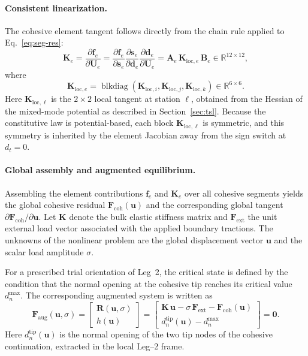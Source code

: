 \documentclass[smallextended]{svjour3}       %
\newcommand{\vb}[1]{\bm{#1}}      %
\newcommand{\mat}[1]{\mathbf{#1}}  %
\providecommand{\bd}{\vb d}
\renewcommand{\bd}{\vb d}
\begin{document}
\paragraph{Consistent linearization.}
The cohesive element tangent follows directly from the chain rule applied to
Eq.~\eqref{eq:seg-res}:
\begin{equation}
	\mat K_e
	=
	\frac{\partial \vb f_e}{\partial \vb U_e}
	=
	\frac{\partial \vb f_e}{\partial \vb s_e}
	\frac{\partial \vb s_e}{\partial \bd_e}
	\frac{\partial \bd_e}{\partial \vb U_e}
	=
	\mat A_e\,\mat K_{\mathrm{loc},e}\,\mat B_e
	\in\mathbb R^{12\times 12},
	\label{eq:seg-Ke}
\end{equation}
where
\begin{equation}
	\mat K_{\mathrm{loc},e}
	=
	\operatorname{blkdiag}
	\!\left(
	\mat{K}_{\mathrm{loc},i},
	\mat{K}_{\mathrm{loc},j},
	\mat{K}_{\mathrm{loc},k}
	\right)
	\in\mathbb R^{6\times 6}.
	\label{eq:seg-Kloc}
\end{equation}
Here \(\mathbf K_{\mathrm{loc},\ell}\) is the \(2\times2\) local tangent at
station \(\ell\), obtained from the Hessian of the mixed-mode potential as
described in Section~\ref{sec:tsl}. Because the constitutive law is
potential-based, each block \(\mat{K}_{\mathrm{loc},\ell}\) is symmetric,
and this symmetry is inherited by the element Jacobian away from the sign
switch at \(d_t=0\).

\paragraph{Global assembly and augmented equilibrium.}
Assembling the element contributions \(\vb f_e\) and \(\mat K_e\) over all
cohesive segments yields the global cohesive residual
\(\vb F_{\mathrm{coh}}(\vb u)\) and the corresponding global tangent
\(\partial\vb F_{\mathrm{coh}}/\partial\vb u\). Let \(\mat K\) denote the
bulk elastic stiffness matrix and \(\vb F_{\mathrm{ext}}\) the unit external
load vector associated with the applied boundary tractions. The unknowns of
the nonlinear problem are the global displacement vector \(\vb u\) and the
scalar load amplitude \(\sigma\).

For a prescribed trial orientation of Leg~2, the critical state is defined by
the condition that the normal opening at the cohesive tip reaches its
critical value \(d_n^{\max}\). The corresponding augmented system is written
as
\begin{equation}
	\vb F_{\mathrm{aug}}(\vb u,\sigma)
	=
	\begin{bmatrix}
		\vb R(\vb u,\sigma)\\[3pt]
		h(\vb u)
	\end{bmatrix}
	=
	\begin{bmatrix}
		\mat K\,\vb u-\sigma\,\vb F_{\mathrm{ext}}-\vb F_{\mathrm{coh}}(\vb u)\\[6pt]
		d_n^{\mathrm{tip}}(\vb u)-d_n^{\max}
	\end{bmatrix}
	=
	\vb 0.
	\label{eq:aug-res}
\end{equation}
Here \(d_n^{\mathrm{tip}}(\vb u)\) is the normal opening of the two tip nodes
of the cohesive continuation, extracted in the local Leg--2 frame.
\end{document}
